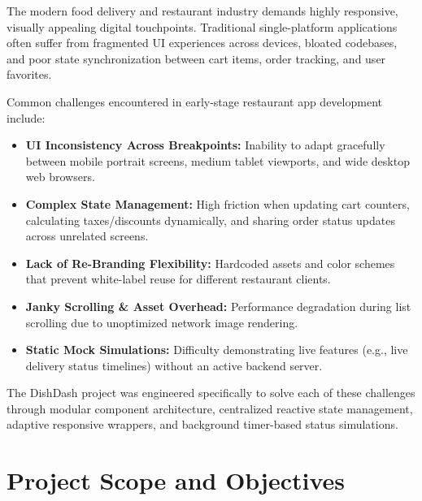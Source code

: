 \documentclass[11pt,a4paper]{article}
\begin{document}
The modern food delivery and restaurant industry demands highly responsive, visually appealing digital touchpoints. Traditional single-platform applications often suffer from fragmented UI experiences across devices, bloated codebases, and poor state synchronization between cart items, order tracking, and user favorites.

Common challenges encountered in early-stage restaurant app development include:
\begin{itemize}[leftmargin=*]
    \item \textbf{UI Inconsistency Across Breakpoints:} Inability to adapt gracefully between mobile portrait screens, medium tablet viewports, and wide desktop web browsers.
    \item \textbf{Complex State Management:} High friction when updating cart counters, calculating taxes/discounts dynamically, and sharing order status updates across unrelated screens.
    \item \textbf{Lack of Re-Branding Flexibility:} Hardcoded assets and color schemes that prevent white-label reuse for different restaurant clients.
    \item \textbf{Janky Scrolling \& Asset Overhead:} Performance degradation during list scrolling due to unoptimized network image rendering.
    \item \textbf{Static Mock Simulations:} Difficulty demonstrating live features (e.g., live delivery status timelines) without an active backend server.
\end{itemize}

The DishDash project was engineered specifically to solve each of these challenges through modular component architecture, centralized reactive state management, adaptive responsive wrappers, and background timer-based status simulations.

\FloatBarrier

\section{Project Scope and Objectives}
\end{document}
